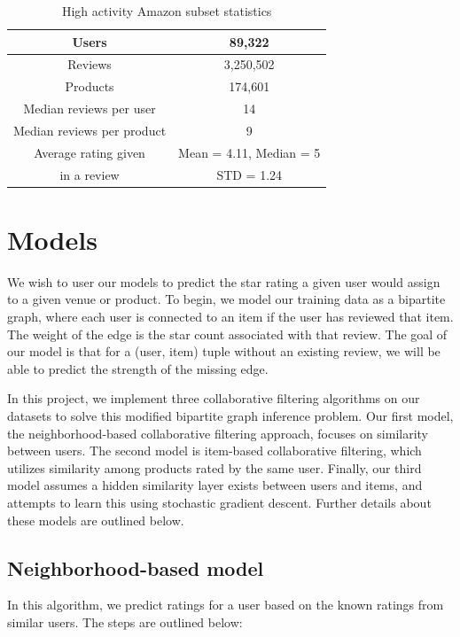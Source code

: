 \documentclass[letterpaper, 11 pt, conference]{ieeeconf}
\begin{document}
\begin{table}[htb]
\centering
\begin{tabular}{|c|c|}
\hline
Users & 89,322 \tabularnewline \hline
Reviews & 3,250,502 \tabularnewline \hline
Products & 174,601 \tabularnewline \hline
Median reviews per user & 14
\tabularnewline \hline
Median reviews per product & 9
\tabularnewline \hline
Average rating given &Mean = 4.11, Median = 5 \tabularnewline
in a review &STD = 1.24
\tabularnewline \hline

\end{tabular}
\caption{ High activity Amazon subset statistics }
\label{table:amazonstats_sub}
\end{table}


\section{Models}
\label{sec:models}

We wish to user our models to predict the star rating a given user would 
assign to a given venue or product. To begin, we model our training data as a 
bipartite graph, where each user is connected to an item if the user 
has reviewed
that item. The weight of the edge is the star count associated with that
review. The goal of our model is that for a (user, item) tuple without an
existing review, we will be able to predict the strength of the missing
edge.

In this project, we implement three collaborative filtering algorithms on our 
datasets to solve this modified bipartite graph inference problem. 
Our first model, the neighborhood-based collaborative
filtering approach, focuses on similarity between users. The second model
is item-based collaborative filtering, which utilizes 
similarity among products rated by the same user. Finally, our third model
assumes a hidden similarity layer exists between users and items, and
attempts to learn this using stochastic gradient descent. Further details
about these models are outlined below.

\subsection{Neighborhood-based model}

In this algorithm, we predict ratings for a user based on the known
ratings from similar users. The steps are outlined below:
\end{document}
